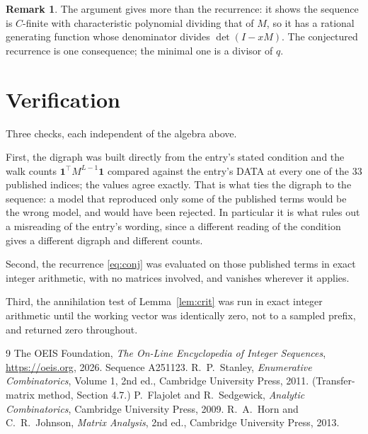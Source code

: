 \documentclass[11pt,a4paper]{article}
\theoremstyle{plain}
\theoremstyle{definition}
\newtheorem{remark}[theorem]{Remark}
\begin{document}
\begin{remark}
The argument gives more than the recurrence: it shows the sequence is $C$-finite with
characteristic polynomial dividing that of $M$, so it has a rational generating function
whose denominator divides $\det(I-xM)$. The conjectured recurrence is one consequence; the
minimal one is a divisor of $q$.
\end{remark}

\section{Verification}

Three checks, each independent of the algebra above.

First, the digraph was built directly from the entry's stated condition and the walk counts
$\mathbf{1}^{\!\top}M^{L-1}\mathbf{1}$ compared against the entry's DATA at
every one of the $33$ published indices; the values agree exactly. That is what ties
the digraph to the sequence: a model that reproduced only some of the published terms would
be the wrong model, and would have been rejected. In particular it is what rules out a
misreading of the entry's wording, since a different reading of the condition gives a
different digraph and different counts.

Second, the recurrence \eqref{eq:conj} was evaluated on those published terms in exact
integer arithmetic, with no matrices involved, and vanishes wherever it applies.

Third, the annihilation test of Lemma~\ref{lem:crit} was run in exact integer arithmetic
until the working vector was identically zero, not to a sampled prefix, and returned zero
throughout.

\begin{thebibliography}{9}
 The OEIS Foundation, \emph{The On-Line Encyclopedia of Integer
Sequences}, \url{https://oeis.org}, 2026. Sequence A251123.
 R.~P.~Stanley, \emph{Enumerative Combinatorics}, Volume 1, 2nd ed.,
Cambridge University Press, 2011. (Transfer-matrix method, Section 4.7.)
 P.~Flajolet and R.~Sedgewick, \emph{Analytic Combinatorics}, Cambridge
University Press, 2009.
 R.~A.~Horn and C.~R.~Johnson, \emph{Matrix Analysis}, 2nd ed., Cambridge
University Press, 2013.
\end{thebibliography}
\end{document}
